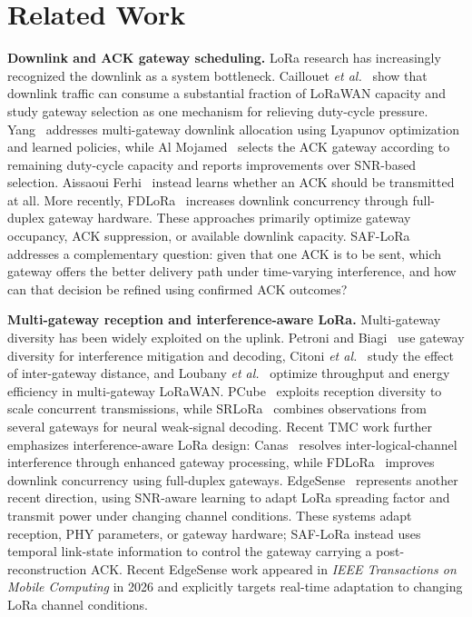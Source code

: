 \documentclass[journal]{IEEEtran}
\begin{document}
\section{Related Work}

\textbf{Downlink and ACK gateway scheduling.}
LoRa research has increasingly recognized the downlink as a system bottleneck. Caillouet \emph{et al.}~\cite{caillouet2024} show that downlink traffic can consume a substantial fraction of LoRaWAN capacity and study gateway selection as one mechanism for relieving duty-cycle pressure. Yang~\cite{yang2025} addresses multi-gateway downlink allocation using Lyapunov optimization and learned policies, while Al Mojamed~\cite{mojamed2023} selects the ACK gateway according to remaining duty-cycle capacity and reports improvements over SNR-based selection. Aissaoui Ferhi~\cite{ferhi2025} instead learns whether an ACK should be transmitted at all. More recently, FDLoRa~\cite{fdlora2025} increases downlink concurrency through full-duplex gateway hardware. These approaches primarily optimize gateway occupancy, ACK suppression, or available downlink capacity. SAF-LoRa addresses a complementary question: given that one ACK is to be sent, which gateway offers the better delivery path under time-varying interference, and how can that decision be refined using confirmed ACK outcomes?

\textbf{Multi-gateway reception and interference-aware LoRa.}
Multi-gateway diversity has been widely exploited on the uplink. Petroni and Biagi~\cite{gw2022} use gateway diversity for interference mitigation and decoding, Citoni \emph{et al.}~\cite{gw2021dist} study the effect of inter-gateway distance, and Loubany \emph{et al.}~\cite{gw2023energy, gw2023throughput} optimize throughput and energy efficiency in multi-gateway LoRaWAN. PCube~\cite{pcube2021} exploits reception diversity to scale concurrent transmissions, while SRLoRa~\cite{srlora2023} combines observations from several gateways for neural weak-signal decoding. Recent TMC work further emphasizes interference-aware LoRa design: Canas~\cite{canas2026} resolves inter-logical-channel interference through enhanced gateway processing, while FDLoRa~\cite{fdlora2025} improves downlink concurrency using full-duplex gateways. EdgeSense~\cite{edgesense2026} represents another recent direction, using SNR-aware learning to adapt LoRa spreading factor and transmit power under changing channel conditions. These systems adapt reception, PHY parameters, or gateway hardware; SAF-LoRa instead uses temporal link-state information to control the gateway carrying a post-reconstruction ACK. Recent EdgeSense work appeared in \emph{IEEE Transactions on Mobile Computing} in 2026 and explicitly targets real-time adaptation to changing LoRa channel conditions.
\end{document}
